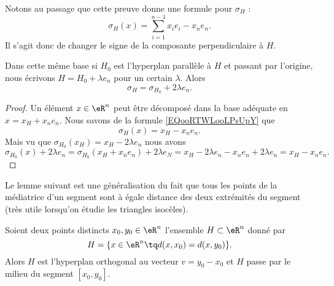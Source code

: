 Notons au passage que cette preuve donne une formule pour \( \sigma_H\) :
\begin{equation}        \label{EQooRTWLooLPsUpY}
    \sigma_H(x)=\sum_{i=1}^{n-1}x_ie_i-x_ne_n.
\end{equation}
Il s'agit donc de changer le signe de la composante perpendiculaire à \( H\).

\begin{lemma}       \label{LEMooWYVRooQmWqvM}
    Dans cette même base si \( H_0\) est l'hyperplan parallèle à \( H\) et passant par l'origine, nous écrivons \( H=H_0+\lambda e_n\) pour un certain \( \lambda\). Alors
    \begin{equation}
        \sigma_H=\sigma_{H_0}+2\lambda e_n.
    \end{equation}
\end{lemma}

\begin{proof}
    Un élément \( x\in \eR^n\) peut être décomposé dans la base adéquate en \( x=x_H+x_ne_n\). Nous savons de la formule \eqref{EQooRTWLooLPsUpY} que
    \begin{equation}
        \sigma_H(x)=x_H-x_ne_n.
    \end{equation}
    Mais vu que \( \sigma_{H_0}(x_H)=x_H-2\lambda e_n\) nous avons
    \begin{equation}
            \sigma_{H_0}(x)+2\lambda e_n=\sigma_{H_0}(x_H+x_ne_n)+2\lambda e_N=x_H-2\lambda e_n-x_ne_n+2\lambda e_n=x_H-x_ne_n.
    \end{equation}
\end{proof}

Le lemme suivant est une généralisation du fait que tous les points de la médiatrice d'un segment sont à égale distance des deux extrémités du segment (très utile lorsqu'on étudie les triangles isocèles).
\begin{lemma}        \label{LEMooDPLYooJKZxiM}
    Soient deux points distincts \( x_0,y_0\in \eR^n\) l'ensemble \( H\subset \eR^n\) donné par
    \begin{equation}
        H=\{ x\in \eR^n\tq d(x,x_0)=d(x,y_0) \}.
    \end{equation}
    Alors \( H\) est l'hyperplan orthogonal au vecteur \( v=y_0-x_0\) et \( H\) passe par le milieu du segment \( [x_0,y_0] \).
\end{lemma}

